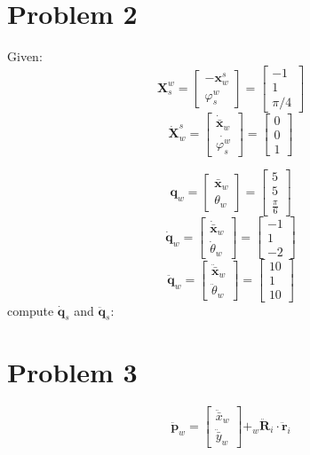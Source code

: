 \documentclass[10pt,letterpaper]{article}
\providecommand{\vect}[1]{\boldsymbol#1}
\providecommand{\mat}[1]{\mathbf#1}
\begin{document}
	\section*{Problem 2}
	Given:
	\[
	\vect{X}^w_s = \begin{bmatrix} -\vect{x}^s_w \\ \varphi^w_s \end{bmatrix} = \begin{bmatrix} -1 \\ 1 \\ \pi/4 \end{bmatrix}
	\]
	\[
	\dot{\vect{X}}^s_w = \begin{bmatrix} \dot{\bar{\vect{x}}}_w \\ \dot{\varphi^w_s} \end{bmatrix} = \begin{bmatrix} 0 \\ 0 \\ 1 \end{bmatrix}
	\]

	\[
	\vect{q}_w = \begin{bmatrix} \bar{\vect{x}}_w \\ \theta_w \end{bmatrix} = \begin{bmatrix} 5 \\ 5 \\ \frac{\pi}{6} \end{bmatrix}
	\]
	\[
	\dot{\vect{q}}_w = \begin{bmatrix} \dot{\bar{\vect{x}}}_w \\ \dot{\theta}_w \end{bmatrix} = \begin{bmatrix} -1 \\ 1 \\ -2 \end{bmatrix}
	\]
	\[
	\ddot{\vect{q}}_w = \begin{bmatrix} \ddot{\bar{\vect{x}}}_w \\ \ddot{\theta}_w \end{bmatrix} = \begin{bmatrix} 10 \\ 1 \\ 10 \end{bmatrix}
	\]
	compute $\dot{\vect{q}}_s$ and $\ddot{\vect{q}}_s$:

	\section*{Problem 3}
	\[
		\ddot{\vect{p}}_w = \begin{bmatrix} \ddot{\bar{x}}_w \\ \ddot{\bar{y}}_w \end{bmatrix} +  _w\ddot{\mat{R}}_i \cdot \ddot{\vect{r}}_i
	\]
\end{document}
